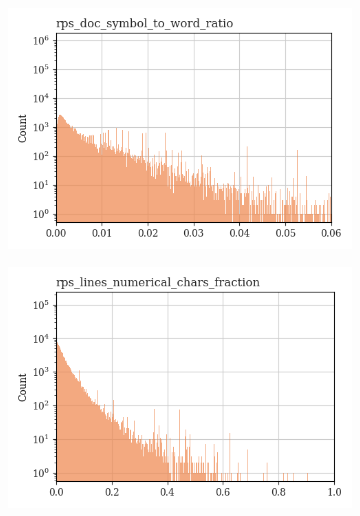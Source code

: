 \documentclass{article}
\begin{document}
\begin{figure}
\begin{subfigure}[b]{0.32\textwidth}
    \end{subfigure}
    \hfill
    \begin{subfigure}[b]{0.32\textwidth}
        \centering
        \includegraphics[width=\textwidth]{figures/quality_signals/rps_doc_symbol_to_word_ratio.png}
    \end{subfigure}
    \hfill
    \begin{subfigure}[b]{0.32\textwidth}
        \centering
        \includegraphics[width=\textwidth]{figures/quality_signals/rps_lines_numerical_chars_fraction.png}
    \end{subfigure}
    \begin{subfigure}[b]{0.32\textwidth}
        \centering

\end{subfigure}
\end{figure}
\end{document}
